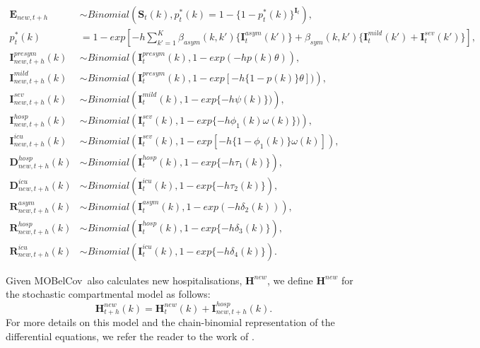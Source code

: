 \documentclass{article}
\newcommand{\momdpname}{MOBelCov}
\begin{document}
\begin{align*}
\textbf{E}_{new, t+h} & \sim \textit{Binomial} \left( \textbf{S}_{t} (k), p^{*}_t (k) = 1 - \{ 1 -  p^{*}_t (k)\}^{\textbf{I}_{t}} \right), \\
%
p^{*}_t (k) & = 1 - exp \left[ -h \sum^{K}_{k' = 1} \beta_{asym}(k, k')\{ \textbf{I}^{asym}_{t}(k')\} + \beta_{sym}(k, k') \{\textbf{I}^{mild}_{t}(k')+\textbf{I}^{sev}_{t}(k')\} \right],\\
%
\textbf{I}^{presym}_{new, t+h} (k)&  \sim Binomial\left( \textbf{I}^{presym}_{t}(k), 1 - exp(-hp(k)\theta) \right),\\
%
\textbf{I}^{mild}_{new, t+h} (k) & \sim Binomial\left( \textbf{I}^{presym}_{t}(k), 1 - exp\left[-h \{1-p(k)\}\theta \right]) \right),\\
%
\textbf{I}^{sev}_{new, t+h} (k) & \sim Binomial\left( \textbf{I}^{mild}_{t}(k), 1 - exp\{-h\psi(k)\}) \right),\\
%
\textbf{I}^{hosp}_{new, t+h} (k) & \sim Binomial\left( \textbf{I}^{sev}_{t}(k), 1 - exp\{-h\phi_{1}(k)\omega(k)\}) \right),\\
%
\textbf{I}^{icu}_{new, t+h} (k) & \sim Binomial\left( \textbf{I}^{sev}_{t}(k), 1 - exp\left[-h \{1-\phi_{1}(k)\}\omega(k) \right] \right),\\
%
\textbf{D}^{hosp}_{new, t+h} (k) & \sim Binomial\left( \textbf{I}^{hosp}_{t}(k), 1 - exp\{-h\tau_{1}(k) \} \right),\\
%
\textbf{D}^{icu}_{new, t+h} (k) & \sim Binomial\left( \textbf{I}^{icu}_{t}(k), 1 - exp\{-h\tau_{2}(k) \} \right),\\
%
\textbf{R}^{asym}_{new, t+h} (k) & \sim Binomial\left( \textbf{I}^{asym}_{t}(k), 1 - exp\left(-h\delta_{2}(k) \right) \right), \\
%
\textbf{R}^{hosp}_{new, t+h} (k) & \sim Binomial\left( \textbf{I}^{hosp}_{t}(k), 1 - exp\{-h\delta_{3}(k) \} \right),\\
%
\textbf{R}^{icu}_{new, t+h} (k) & \sim Binomial\left( \textbf{I}^{icu}_{t}(k), 1 - exp\{-h\delta_{4}(k) \} \right).
\end{align*}

Given \momdpname\ also calculates new hospitalisations, $\textbf{H}^{new}$, we define $\textbf{H}^{new}$ for the stochastic compartmental model as follows:
\[
\textbf{H}^{new}_{t+h}(k) = \textbf{H}^{new}_{t}(k) + \textbf{I}^{hosp}_{new, t+h} (k).
\]
For more details on this model and the chain-binomial representation of the differential equations, we refer the reader to the work of \citet{abrams2021modelling}.
\end{document}
